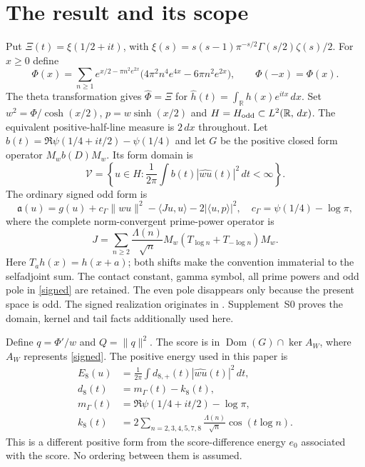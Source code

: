 \documentclass[12pt]{article}
\theoremstyle{remark}\newtheorem{remark}[theorem]{Remark}
\newcommand{\Dom}{\operatorname{Dom}}
\newcommand{\dd}{\,d}
\begin{document}
\section{The result and its scope}
Put $\Xi(t)=\xi(1/2+it)$, with
$\xi(s)=s(s-1)\pi^{-s/2}\Gamma(s/2)\zeta(s)/2$. For $x\ge0$ define
\[
 \Phi(x)=\sum_{n\ge1}e^{x/2-\pi n^2e^{2x}}
       \bigl(4\pi^2n^4e^{4x}-6\pi n^2e^{2x}\bigr),
 \qquad \Phi(-x)=\Phi(x).
\]
The theta transformation gives $\widehat\Phi=\Xi$ for
$\widehat h(t)=\int_{\mathbb R}h(x)e^{itx}\dd x$.
Set $w^2=\Phi/\cosh(x/2)$, $p=w\sinh(x/2)$ and
$H=H_{\rm odd}\subset L^2(\mathbb R,\dd x)$. The equivalent
positive-half-line measure is $2\dd x$ throughout.
Let $b(t)=\Re\psi(1/4+it/2)-\psi(1/4)$ and let $G$ be the
positive closed form operator $M_wb(D)M_w$. Its form domain is
\[
 \mathcal V=\left\{u\in H:
   \frac1{2\pi}\int b(t)|\widehat{wu}(t)|^2\dd t<\infty\right\}.
\]
The ordinary signed odd form is
\begin{equation}\label{signed}
 \mathfrak a(u)=g(u)+c_\Gamma\|wu\|^2
       -\langle Ju,u\rangle-2|\langle u,p\rangle|^2,
 \quad c_\Gamma=\psi(1/4)-\log\pi,
\end{equation}
where the complete norm-convergent prime-power operator is
\[
 J=\sum_{n\ge2}\frac{\Lambda(n)}{\sqrt n}
       M_w(T_{\log n}+T_{-\log n})M_w.
\]
Here $T_a h(x)=h(x+a)$; both shifts make the convention immaterial
to the selfadjoint sum. The contact constant, gamma symbol, all
prime powers and odd pole in \eqref{signed} are retained. The even
pole disappears only because the present space is odd. The signed realization originates in \cite[Lemma 5.1]{Theta}.
Supplement~S0 proves the domain, kernel and tail facts additionally used here.

Define $q=\Phi'/w$ and $Q=\|q\|^2$. The score is in
$\Dom(G)\cap\ker A_W$, where $A_W$ represents \eqref{signed}.
The positive energy used in this paper is
\begin{align}
 E_8(u)&=\frac1{2\pi}\int d_{8,+}(t)|\widehat{wu}(t)|^2\dd t,
 \label{energy}\\
 d_8(t)&=m_\Gamma(t)-k_8(t),\nonumber\\
 m_\Gamma(t)&=\Re\psi(1/4+it/2)-\log\pi,\nonumber\\
 k_8(t)&=2\sum_{n=2,3,4,5,7,8}\frac{\Lambda(n)}{\sqrt n}
                     \cos(t\log n).\nonumber
\end{align}
This is a different positive form from the score-difference energy
$e_0$ associated with the score. No ordering between them is assumed.
\end{document}
